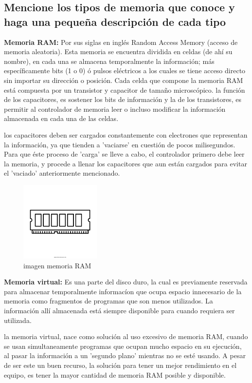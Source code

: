 \documentclass{article}
\begin{document}
\subsection{Mencione los tipos de memoria que conoce y haga una pequeña descripción de cada tipo}
%
\textbf{Memoria RAM:} Por sus siglas en inglés Random Access Memory (acceso de memoria aleatoria). Esta memoria se encuentra dividida en celdas (de ahí su nombre), en cada una se almacena temporalmente la información; más específicamente bits (1 o 0) ó pulsos eléctricos a los cuales se tiene acceso directo sin importar su dirección o posición.
Cada celda que compone la memoria RAM está compuesta por un transistor y capacitor de tamaño microscópico.
la función de los capacitores, es sostener los bits de información y la de los transistores, es permitir al controlador de memoria leer o incluso modificar la información almacenada en cada una de las celdas.

los capacitores deben ser cargados constantemente con electrones que representan la información, ya que tienden a 'vaciarse' en cuestión de pocos milisegundos. Para que éste proceso de 'carga' se lleve a cabo, el controlador primero debe leer la memoria, y procede a llenar los capacitores que aun están cargados para evitar el 'vaciado' anteriormente mencionado.\\
%
\begin{figure}[h]
\includegraphics[width=4cm]{memoriaRAM.png}
\centering
\caption{imagen memoria RAM}
\label{fig:memoriaRAM}
\end{figure}

\textbf{Memoria virtual:} Es una parte del disco duro, la cual es previamente reservada para almacenar temporalmente informacíon que ocupa espacio innecesario de la memoria como fragmentos de programas que son menos utilizados. La información allí almacenada está siempre disponible para cuando requiera ser utilizada. 

la memoria virtual, nace como solución al uso excesivo de memoria RAM, cuando se usan simultaneamente programas que ocupan mucho espacio en su ejecución, al pasar la información a un 'segundo plano' mientras no se esté usando.
A pesar de ser este un buen recurso, la solución para tener un mejor rendimiento en el equipo, es tener la mayor cantidad de memoria RAM posible y disponible.\\
\end{document}
